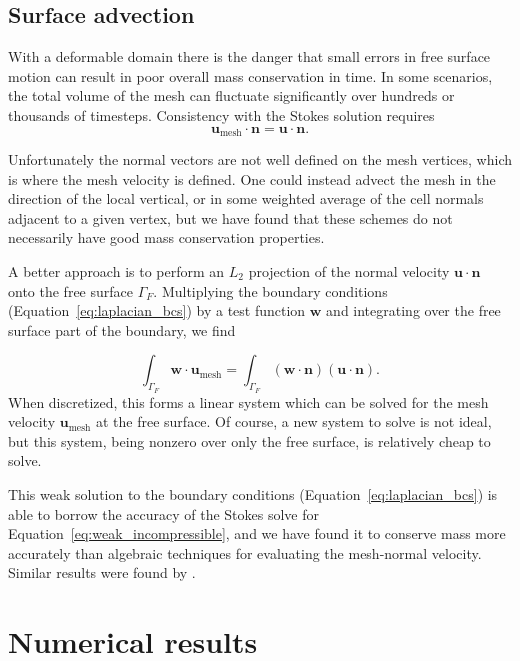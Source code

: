 \documentclass[preprint,12pt,authoryear]{elsarticle}
\begin{document}
\subsection{Surface advection}
With a deformable domain there is the danger that small errors in free surface motion can
result in poor overall mass conservation in time. In some scenarios, the total volume of the mesh can 
fluctuate significantly over hundreds or thousands of timesteps.
Consistency with the Stokes solution requires 
\begin{equation}
\mathbf{u}_{\mathrm{mesh}} \cdot \mathbf{n} = \mathbf{u \cdot n}.
\end{equation}

Unfortunately the normal vectors are not well defined on the mesh vertices, which is 
where the mesh velocity is defined. One could instead advect the mesh in the direction 
of the local vertical, or in some weighted average of the cell normals adjacent to a given vertex,
but we have found that these schemes do not necessarily have good mass conservation 
properties.

A better approach is to perform an $L_2$ projection of the normal velocity $\mathbf{u}\cdot\mathbf{n}$
onto the free surface $\Gamma_F$. Multiplying the boundary conditions 
(Equation~\eqref{eq:laplacian_bcs}) by a test function $\mathbf{w}$ and integrating over the free
surface part of the boundary, we find

\begin{equation}
\int_{\Gamma_F} \mathbf{w} \cdot \mathbf{u}_\mathrm{mesh} = 
\int_{\Gamma_F} \left( \mathbf{w \cdot n } \right) \left( \mathbf{u \cdot n} \right).
\end{equation}
When discretized, this forms a linear system which can be solved for the mesh velocity $\mathbf{u}_\mathrm{mesh}$ at the 
free surface. Of course, a new system to solve is not ideal, but this system, being nonzero 
over only the free surface, is relatively cheap to solve.

This weak solution to the boundary conditions (Equation~\eqref{eq:laplacian_bcs}) is able to borrow
the accuracy of the Stokes solve for Equation~\eqref{eq:weak_incompressible}, and we have 
found it to conserve mass more accurately than algebraic techniques for evaluating the mesh-normal velocity.
Similar results were found by \citet{fullsack1995arbitrary}.

\section{Numerical results}
\label{sec:results}
\end{document}
